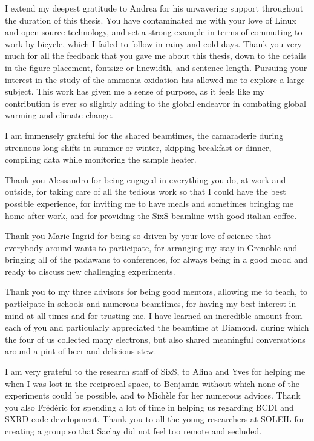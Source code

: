 I extend my deepest gratitude to Andrea for his unwavering support throughout the duration of this thesis.
You have contaminated me with your love of Linux and open source technology, and set a strong example in terms of commuting to work by bicycle, which I failed to follow in rainy and cold days.
Thank you very much for all the feedback that you gave me about this thesis, down to the details in the figure placement, fontsize or linewidth, and sentence length.
Pursuing your interest in the study of the ammonia oxidation has allowed me to explore a large subject.
This work has given me a sense of purpose, as it feels like my contribution is ever so slightly adding to the global endeavor in combating global warming and climate change.

I am immensely grateful for the shared beamtimes, the camaraderie during strenuous long shifts in summer or winter, skipping breakfast or dinner, compiling data while monitoring the sample heater.

Thank you Alessandro for being engaged in everything you do, at work and outside, for taking care of all the tedious work so that I could have the best possible experience, for inviting me to have meals and sometimes bringing me home after work, and for providing the SixS beamline with good italian coffee.

Thank you Marie-Ingrid for being so driven by your love of science that everybody around wants to participate, for arranging my stay in Grenoble and bringing all of the padawans to conferences, for always being in a good mood and ready to discuss new challenging experiments.

Thank you to my three advisors for being good mentors, allowing me to teach, to participate in schools and numerous beamtimes, for having my best interest in mind at all times and for trusting me.
I have learned an incredible amount from each of you and particularly appreciated the beamtime at Diamond, during which the four of us collected many electrons, but also shared meaningful conversations around a pint of beer and delicious stew.

I am very grateful to the research staff of SixS, to Alina and Yves for helping me when I was lost in the reciprocal space, to Benjamin without which none of the experiments could be possible, and to Michèle for her numerous advices.
Thank you also Frédéric for spending a lot of time in helping us regarding BCDI and SXRD code development.
Thank you to all the young researchers at SOLEIL for creating a group so that Saclay did not feel too remote and secluded.

